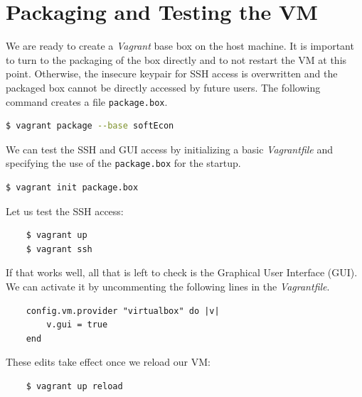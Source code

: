 \section{Packaging and Testing the VM}
We are ready to create a \textit{Vagrant} base box on the host machine. It is important to turn to the packaging of the box directly and to not restart the VM at this point. Otherwise, the insecure keypair for SSH access is overwritten and the packaged box cannot be directly accessed by future users.
%
The following command creates a file \verb+package.box+.
%
\vspace{0.2cm}\begin{lstlisting}[language=bash]
    $ vagrant package --base softEcon
\end{lstlisting}\vspace{0.2cm}
%
We can test the SSH and GUI access by initializing a basic \textit{Vagrantfile} and specifying the use of the \verb+package.box+ for the startup.
%
\vspace{0.2cm}\begin{lstlisting}[language=bash]
    $ vagrant init package.box
\end{lstlisting}\vspace{0.2cm}
%
Let us test the SSH access:
\vspace{0.2cm}\begin{lstlisting} 
    $ vagrant up
    $ vagrant ssh
\end{lstlisting}\vspace{0.2cm}
%
If that works well, all that is left to check is the Graphical User Interface (GUI). We can activate it by uncommenting the following lines in the \textit{Vagrantfile}.
%
\vspace{0.2cm}\begin{lstlisting} 
    config.vm.provider "virtualbox" do |v|
        v.gui = true
    end
\end{lstlisting}\vspace{0.2cm}
%
These edits take effect once we reload our VM:
%
\vspace{0.2cm}\begin{lstlisting} 
    $ vagrant up reload
\end{lstlisting}
